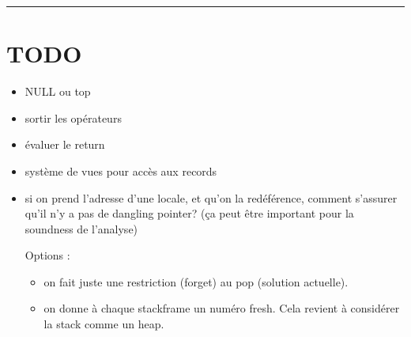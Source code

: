 \begin{center}\rule{3in}{0.4pt}\end{center}

\section*{TODO}

\begin{itemize}
\item NULL ou top
\item sortir les opérateurs
\item évaluer le return
\item
  système de vues pour accès aux records
\item
  si on prend l'adresse d'une locale, et qu'on la redéférence, comment s'assurer
  qu'il n'y a pas de dangling pointer? (ça peut être important pour la soundness
  de l'analyse)

  Options :

\begin{itemize}
\item
  on fait juste une restriction (forget) au pop (solution actuelle).
\item
  on donne à chaque stackframe un numéro fresh. Cela revient à considérer la
  stack comme un heap.
\end{itemize}

\end{itemize}

